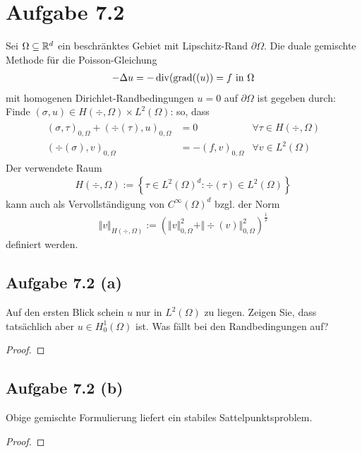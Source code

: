 \documentclass[12pt,a4paper]{article}
\begin{document}
\section*{Aufgabe 7.2}
Sei $\Omega\subseteq\mathbb{R}^d$ ein beschränktes Gebiet mit Lipschitz-Rand $\partial\Omega$.
Die duale gemischte Methode für die Poisson-Gleichung 
\begin{align*}
	-\Delta u=-\operatorname{div}(\operatorname{grad}((u))=f\text{ in }\Omega
\end{align*}
mit homogenen Dirichlet-Randbedingungen $u=0$ auf $\partial\Omega$ ist gegeben durch:\nl
Finde $(\sigma,u)\in H(\div,\Omega)\times L^2(\Omega)$: so, dass
\begin{align*}
	\begin{array}{rll}
		(\sigma,\tau)_{0,\Omega}+(\div(\tau),u)_{0,\Omega}&=0&\forall\tau\in H(\div,\Omega)\\
		(\div(\sigma),v)_{0,\Omega} &=-(f,v)_{0,\Omega} &\forall v\in L^2(\Omega)
	\end{array}
\end{align*}
Der verwendete Raum
\begin{align*}
	H(\div,\Omega):=\left\lbrace\tau\in L^2(\Omega)^d:\div(\tau)\in L^2(\Omega)\right\rbrace
\end{align*}
kann auch als Vervollständigung von $C^\infty(\Omega)^d$ bzgl. der Norm 
\begin{align*}
	\Vert v\Vert_{H(\div,\Omega)}:=\left(\Vert v\Vert_{0,\Omega}^2+\Vert\div(v)\Vert_{0,\Omega}^2\right)^{\frac{1}{2}}
\end{align*}
definiert werden.

\subsection*{Aufgabe 7.2 (a)}
Auf den ersten Blick schein $u$ nur in $L^2(\Omega)$ zu liegen.
Zeigen Sie, dass tatsächlich aber $u\in H_0^1(\Omega)$ ist.
Was fällt bei den Randbedingungen auf?

\begin{proof}
\end{proof}

\subsection*{Aufgabe 7.2 (b)}
Obige gemischte Formulierung liefert ein stabiles Sattelpunktsproblem.

\begin{proof}
\end{proof}
\end{document}
